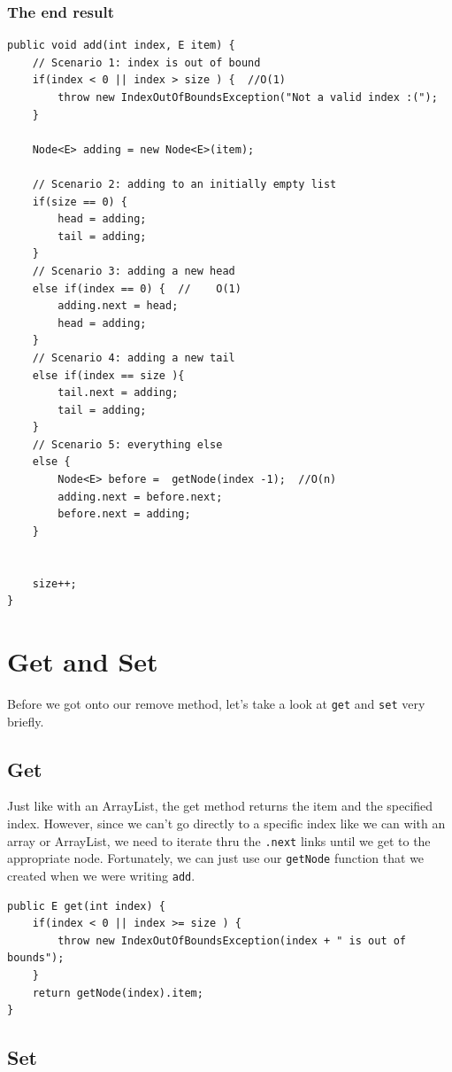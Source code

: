\documentclass[10pt,a4paper]{book}
\begin{document}
\subsubsection{The end result}
\begin{verbatim}
public void add(int index, E item) {
	// Scenario 1: index is out of bound
	if(index < 0 || index > size ) {  //O(1)
		throw new IndexOutOfBoundsException("Not a valid index :(");
	}
	
	Node<E> adding = new Node<E>(item);
	
	// Scenario 2: adding to an initially empty list
	if(size == 0) {
		head = adding;
		tail = adding;
	}
	// Scenario 3: adding a new head
	else if(index == 0) {  //    O(1)
		adding.next = head;
		head = adding;
	}
	// Scenario 4: adding a new tail
	else if(index == size ){
		tail.next = adding;
		tail = adding;
	}
	// Scenario 5: everything else
	else {
		Node<E> before =  getNode(index -1);  //O(n)
		adding.next = before.next;
		before.next = adding;
	}
	
	
	size++;
}
\end{verbatim}



\section{Get and Set}
Before we got onto our remove method, let's take a look at \texttt{get} and \texttt{set} very briefly.

\subsection{Get}
Just like with an ArrayList, the get method returns the item and the specified index.  
However, since we can't go directly to a specific index like we can with an array or ArrayList, we need to iterate thru the \texttt{.next} links until we get to the appropriate node.
Fortunately, we can just use our \texttt{getNode} function that we created when we were writing \texttt{add}.

 

\begin{verbatim}
public E get(int index) {
	if(index < 0 || index >= size ) { 
		throw new IndexOutOfBoundsException(index + " is out of bounds");
	}
	return getNode(index).item;
}
\end{verbatim}


\subsection{Set}
\end{document}
